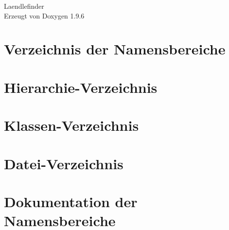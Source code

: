 \documentclass[twoside]{book}
\newcommand{\+}{\discretionary{\mbox{\scriptsize$\hookleftarrow$}}{}{}}
\newcommand{\clearemptydoublepage}{%
    \newpage{\pagestyle{empty}\cleardoublepage}%
  }
\begin{document}
  \raggedbottom
    \hypersetup{pageanchor=false,
                bookmarksnumbered=true,
                pdfencoding=unicode
               }
  \begin{titlepage}
  \vspace*{7cm}
  \begin{center}%
  {\Large Laendlefinder}\\
  \vspace*{1cm}
  {\large Erzeugt von Doxygen 1.9.6}\\
  \end{center}
  \end{titlepage}
  \clearemptydoublepage
  \tableofcontents
  \clearemptydoublepage
  \hypersetup{pageanchor=true}
\chapter{Verzeichnis der Namensbereiche}

\chapter{Hierarchie-\/\+Verzeichnis}

\chapter{Klassen-\/\+Verzeichnis}

\chapter{Datei-\/\+Verzeichnis}

\chapter{Dokumentation der Namensbereiche}






\end{document}
